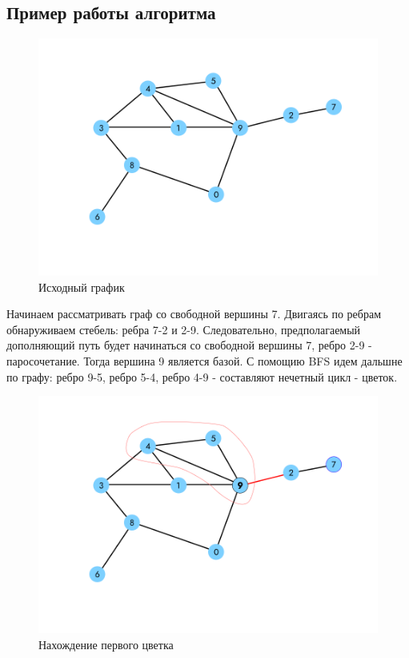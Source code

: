 \documentclass[14pt, a4paper]{extarticle}
\begin{document}
    \subsection*{Пример работы алгоритма}


    \begin{figure}[h!]
        \centering
        \includegraphics[scale=0.3]{1.png}
        \caption{Исходный график}
        \label{fig:my_label}
    \end{figure}

    Начинаем рассматривать граф со свободной вершины 7. Двигаясь по ребрам обнаруживаем стебель: ребра 7-2 и  2-9. Следовательно, предполагаемый дополняющий путь будет начинаться со свободной вершины 7, ребро 2-9 - паросочетание. Тогда вершина 9 является базой. С помощию BFS идем дальшне по графу:
    ребро 9-5, ребро 5-4, ребро 4-9 - составляют нечетный цикл - цветок.
    
    \begin{figure}[h!]
        \centering
        \includegraphics[scale=0.3]{2.png}
        \caption{Нахождение первого цветка}
        \label{fig:my_label}
    \end{figure}
\end{document}
